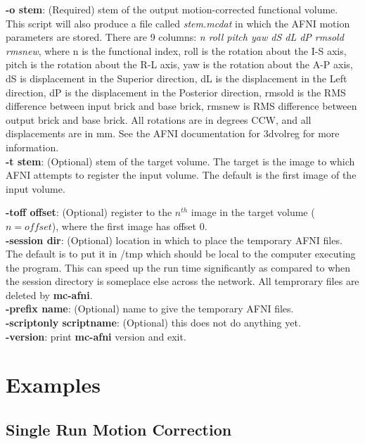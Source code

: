 \documentclass[10pt]{article}
\begin{document}
\noindent
{\bf -o stem}: (Required) stem of the output motion-corrected functional
volume. This script will also produce a file called {\em stem.mcdat}
in which the AFNI motion parameters are stored.  There are 9 columns:
{\em n roll pitch yaw dS dL dP rmsold rmsnew}, where n is the
functional index, roll is the rotation about the I-S axis, pitch is
the rotation about the R-L axis, yaw is the rotation about the A-P
axis, dS is displacement in the Superior direction, dL is the
displacement in the Left direction, dP is the displacement in the
Posterior direction, rmsold is the RMS difference between input brick
and base brick, rmsnew is RMS difference between output brick and base
brick.  All rotations are in degrees CCW, and all displacements are in
mm. See the AFNI documentation for 3dvolreg for more information.\\

\noindent
{\bf -t stem}: (Optional) stem of the target volume.  The target is the image to
which AFNI attempts to register the input volume.  The default is the
first image of the input volume.

\noindent
{\bf -toff offset}: (Optional) register to the $n^{th}$ image in the target
volume ($n = offset$), where the first image has offset 0.\\

\noindent
{\bf -session dir}: (Optional) location in which to place the temporary AFNI
files. The default is to put it in /tmp which should be local to the
computer executing the program.  This can speed up the run time
significantly as compared to when the session directory is someplace
else across the network. All temprorary files are deleted by {\bf
mc-afni}. \\

\noindent
{\bf -prefix name}: (Optional) name to give the temporary AFNI files.\\

\noindent
{\bf -scriptonly scriptname}: (Optional) this does not do anything yet.\\

\noindent
{\bf -version}: print {\bf mc-afni} version and exit.\\

\section{Examples}

\subsection{Single Run Motion Correction}
\end{document}
